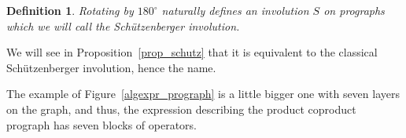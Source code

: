 \documentclass{amsart}
\newtheorem{definition}[theorem]{Definition}
\begin{document}

\begin{definition}
  Rotating by $180^{\circ}$ naturally defines an involution $S$ on
  prographs which we will call the Schützenberger involution.
\end{definition}
We will see in Proposition~\ref{prop_schutz} that it is equivalent to
the classical Schützenberger involution, hence the name.


The example of Figure~\ref{algexpr_prograph} is a little bigger one with
seven layers on the graph, and thus, the expression describing the
product coproduct prograph has seven blocks of operators.
\end{document}
